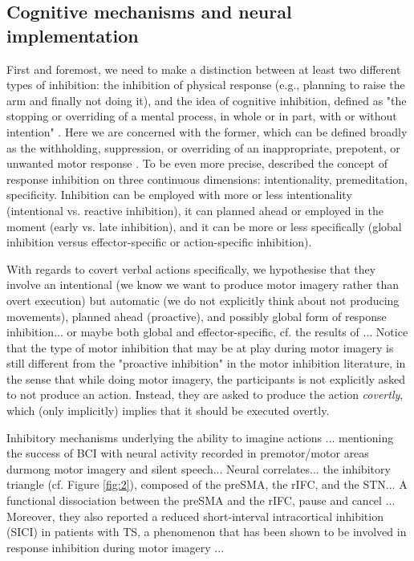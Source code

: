 \documentclass[utf8]{template/frontiersSCNS} %
\begin{document}
\subsection{Cognitive mechanisms and neural implementation}

First and foremost, we need to make a distinction between at least two different types of inhibition: the inhibition of physical response (e.g., planning to raise the arm and finally not doing it), and the idea of cognitive inhibition, defined as "the stopping or overriding of a mental process, in whole or in part, with or without intention" \citep{gorfein_concept_2007}. Here we are concerned with the former, which can be defined broadly as the withholding, suppression, or overriding of an inappropriate, prepotent, or unwanted motor response \citep{aron_neural_2007, oshea_go_2018}. To be even more precise, \cite{ridderinkhof_dont_2014} described the concept of response inhibition on three continuous dimensions: intentionality, premeditation, specificity. Inhibition can be employed with more or less intentionality (intentional vs. reactive inhibition), it can planned ahead or employed in the moment (early vs. late inhibition), and it can be more or less specifically (global inhibition versus effector-specific or action-specific inhibition).

With regards to covert verbal actions specifically, we hypothesise that they involve an intentional (we know we want to produce motor imagery rather than overt execution) but automatic (we do not explicitly think about not producing movements), planned ahead (proactive), and possibly global form of response inhibition... or maybe both global and effector-specific, cf. the results of \cite{rieger_inhibition_2017}... Notice that the type of motor inhibition that may be at play during motor imagery is still different from the "proactive inhibition" in the motor inhibition literature, in the sense that while doing motor imagery, the participants is not explicitly asked to not produce an action. Instead, they are asked to produce the action \textit{covertly}, which (only implicitly) implies that it should be executed overtly.

Inhibitory mechanisms underlying the ability to imagine actions \citep{guillot_imagining_2012, schwoebel_man_2002}... mentioning the success of BCI with neural activity recorded in premotor/motor areas durmong motor imagery and silent speech... Neural correlates... the inhibitory triangle (cf. Figure \ref{fig:2}), composed of the preSMA, the rIFC, and the STN... A functional dissociation between the preSMA and the rIFC, pause and cancel \citep{diesburg_pause-then-cancel_2021}... Moreover, they also reported a reduced short-interval intracortical inhibition (SICI) in patients with TS, a phenomenon that has been shown to be involved in response inhibition during motor imagery \citep{neige_unravelling_2020}...
\end{document}
